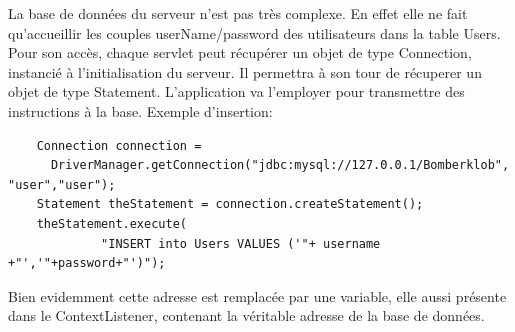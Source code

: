 	La base de données du serveur n'est pas très complexe. En effet elle ne fait
	qu'accueillir les couples userName/password des utilisateurs dans la
	table Users. 
	Pour son accès, chaque servlet peut récupérer un objet de type Connection,
	instancié à l'initialisation du serveur. Il permettra à son tour
	de récuperer un objet de type Statement. L'application va l'employer pour
	transmettre des instructions à la base. Exemple d'insertion: 
		
	\begin{verbatim}
	Connection connection = 
	  DriverManager.getConnection("jdbc:mysql://127.0.0.1/Bomberklob", "user","user");
	Statement theStatement = connection.createStatement();
	theStatement.execute(
		     "INSERT into Users VALUES ('"+ username +"','"+password+"')");
	\end{verbatim}
	
	Bien evidemment cette adresse est remplacée par une variable, elle aussi
	présente dans le ContextListener, contenant la véritable adresse de la base de
	données.
	
	
	
	
